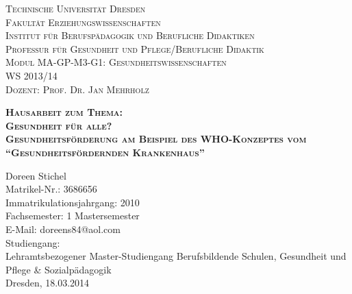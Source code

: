 \begin{titlepage}
\begin{flushleft}
\Large
\scshape
Technische Universität Dresden\\
\normalsize
\upshape
Fakultät Erziehungswissenschaften\\
Institut für Berufspädagogik und Berufliche Didaktiken\\
Professur für Gesundheit und Pflege/Berufliche Didaktik\\[0,5cm]
Modul MA-GP-M3-G1: Gesundheitswissenschaften\\[0,5cm]
WS 2013/14\\
Dozent: Prof. Dr. Jan Mehrholz\\
\end{flushleft}

\vfill

\begin{center}
\Huge
\scshape
\bfseries
Hausarbeit zum Thema:\\[1,0cm]
\Large
\mdseries
Gesundheit für alle?\\[0,5cm]
Gesundheitsförderung am Beispiel des WHO-Konzeptes vom "`Gesundheitsfördernden Krankenhaus"'\\
\end{center}

\vfill

\begin{flushleft}
Doreen Stichel\\
Matrikel-Nr.: 3686656\\
Immatrikulationsjahrgang: 2010\\
Fachsemester: 1 Mastersemester\\
E-Mail: doreens84@aol.com\\[0,5cm]
Studiengang:\\
Lehramtsbezogener Master-Studiengang Berufsbildende Schulen, Gesundheit und Pflege \& Sozialpädagogik\\[0,5cm]
Dresden, 18.03.2014
\end{flushleft}

\end{titlepage}